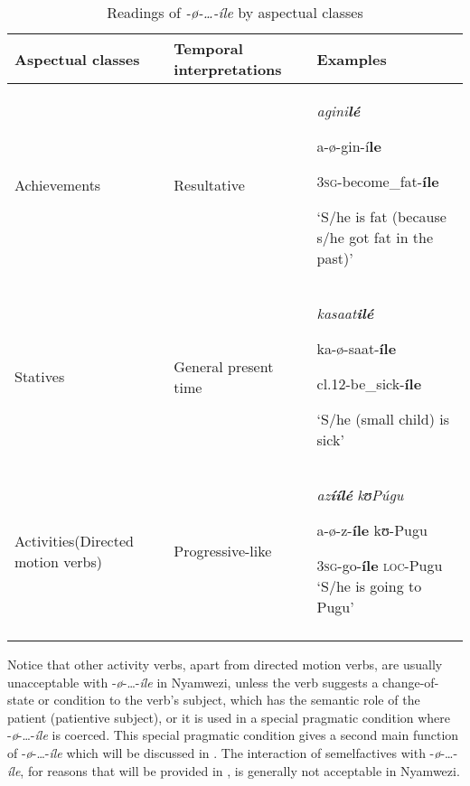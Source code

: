\documentclass[output=paper,newtxmath,modfonts,nonflat,draftmode]{langsci/langscibook}
\begin{document}
\begin{table}
\caption{Readings of \textit{-ø-…-íle} by aspectual classes}
\label{tab:kanijo:2}
\begin{tabularx}{\textwidth}{>{\raggedright}p{3cm}lQ}
\lsptoprule
Aspectual classes & Temporal interpretations & Examples \\
\midrule 
Achievements & Resultative & \textit{agini}\textbf{\textit{lé}} 

a-ø-gin-í\textbf{le} 

3\textsc{sg}-become\_fat-\textbf{íle} 

`S/he is fat (because s/he got fat in the past)’\\

\tablevspace
Statives & General present time & \textit{kasaat}\textbf{\textit{i}}\textbf{\textit{lé}} 

ka\footnotemark{}-ø-saat-\textbf{íle} 

cl.12-be\_sick-\textbf{íle}

‘S/he (small child) is sick’\\

\tablevspace
Activities\newline (Directed motion verbs) & Progressive-like & \textit{az}\textbf{\textit{íílé}         } \hspace{1.2cm}\textit{kʊ}\textit{Púgu}

a-ø-z-\textbf{íle}  \hspace{.85cm}  kʊ-Pugu

3\textsc{sg}-go-\textbf{íle} \textsc{loc}-Pugu 
‘S/he is going to Pugu’\\
\lspbottomrule
\end{tabularx}
\end{table} 


Notice that other activity verbs, apart from directed motion verbs, are usually unacceptable with -\textit{ø}-…-\textit{íle} in Nyamwezi, unless the verb suggests a change-of-state or condition to the verb’s subject, which has the semantic role of the patient (patientive subject), or it is used in a special pragmatic condition where -\textit{ø}-…-\textit{íle} is coerced. This special pragmatic condition gives a second main function of -\textit{ø}-…-\textit{íle} which will be discussed in . The interaction of semelfactives with -\textit{ø}-…-\textit{íle}, for reasons that will be provided in , is generally not acceptable in Nyamwezi. 
 
\end{document}
